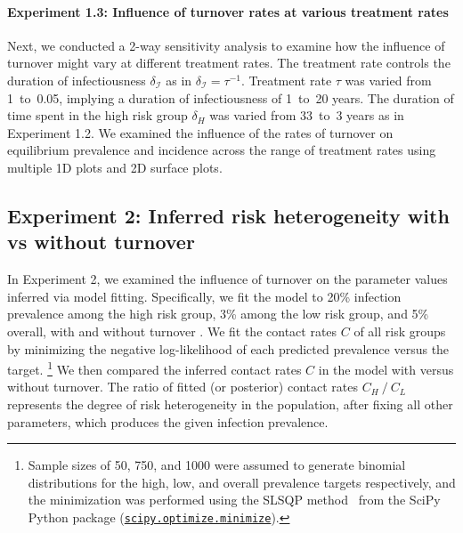 \paragraph{Experiment 1.3: Influence of turnover rates at various treatment rates}
\label{p:exp-turnover-2D}
Next, we conducted a 2-way sensitivity analysis to examine how
the influence of turnover might vary at different treatment rates.
The treatment rate controls the duration of infectiousness $\delta_{\mathcal{I}}$
as in $\delta_{\mathcal{I}} = \tau^{-1}$.
Treatment rate $\tau$ was varied from 1~to~0.05,
implying a duration of infectiousness of 1~to~20 years.
The duration of time spent in the high risk group $\delta_H$
was varied from 33~to~3 years as in Experiment 1.2.
We examined the influence of the rates of turnover on
equilibrium prevalence and incidence across the
range of treatment rates using multiple 1D plots and 2D surface plots.
\subsection{Experiment 2: Inferred risk heterogeneity with vs without turnover}
\label{ss:exp-infer}
In Experiment 2, we examined the influence of turnover on
the parameter values inferred via model fitting.
Specifically, we fit the model to
20\% infection prevalence among the high risk group,
3\% among the low risk group,
and 5\% overall,
with and without turnover .
We fit the contact rates $C$ of all risk groups
by minimizing the negative log-likelihood of each predicted prevalence versus the target.%
\footnote{Sample sizes of 50, 750, and 1000 were assumed to generate binomial distributions
  for the high, low, and overall prevalence targets respectively,
  and the minimization was performed using
  the SLSQP method~\citep{Kraft1988} from the SciPy Python package
  (\href{https://docs.scipy.org/doc/scipy/reference/generated/scipy.optimize.minimize.html}
        {\texttt{scipy.optimize.minimize}}).}
We then compared the inferred contact rates $C$
in the model with versus without turnover.
The ratio of fitted (or posterior) contact rates $C_H~/~C_L$
represents the degree of risk heterogeneity in the population,
after fixing all other parameters,
which produces the given infection prevalence.
